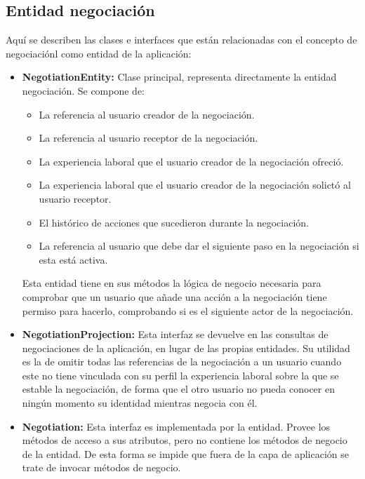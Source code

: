 \documentclass[a4paper, 12pt]{book}
\begin{document}
    \subsection{Entidad negociación}
    \label{subsec:negotiation_entity}
    Aquí se describen las clases e interfaces que están relacionadas con el concepto de negociaciónl como entidad de la aplicación:

    \begin{itemize}
        \item \textbf{NegotiationEntity:} Clase principal, representa directamente la entidad negociación.
        Se compone de:
        \begin{itemize}
            \item La referencia al usuario creador de la negociación.
            \item La referencia al usuario receptor de la negociación.
            \item La experiencia laboral que el usuario creador de la negociación ofreció.
            \item La experiencia laboral que el usuario creador de la negociación solictó al usuario receptor.
            \item El histórico de acciones que sucedieron durante la negociación.
            \item La referencia al usuario que debe dar el siguiente paso en la negociación si esta está activa.
        \end{itemize}
        Esta entidad tiene en sus métodos la lógica de negocio necesaria para comprobar que un usuario que añade una acción a la negociación tiene permiso para hacerlo, comprobando si es el siguiente actor de la negociación.
        \item \textbf{NegotiationProjection:} Esta interfaz se devuelve en las consultas de negociaciones de la aplicación, en lugar de las propias entidades.
        Su utilidad es la de omitir todas las referencias de la negociación a un usuario cuando este no tiene vinculada con su perfil la experiencia laboral sobre la que se estable la negociación, de forma que el otro usuario no pueda conocer en ningún momento su identidad mientras negocia con él.
        \item \textbf{Negotiation:} Esta interfaz es implementada por la entidad. Provee los métodos de acceso a sus atributos, pero no contiene los métodos de negocio de la entidad. De esta forma se impide que fuera de la capa de aplicación se trate de invocar métodos de negocio.
    \end{itemize}
\end{document}
